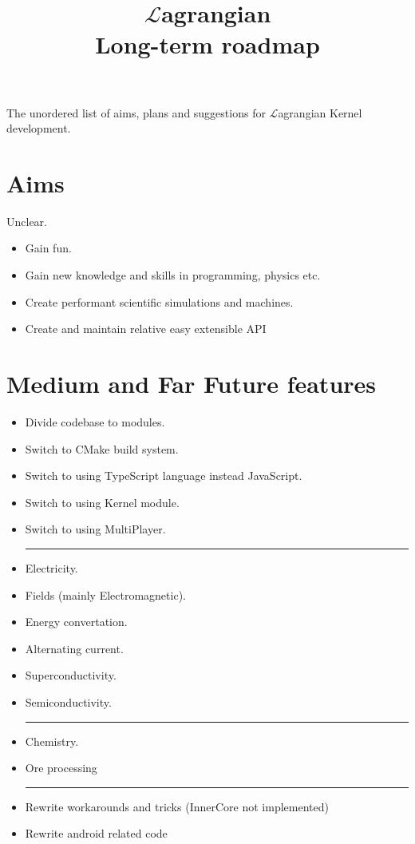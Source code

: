 \documentclass[12pt]{article}
\title{$\mathcal{L}$agrangian \\ Long-term roadmap}
\begin{document}
	\maketitle

	The unordered list of aims, plans and suggestions for $\mathcal{L}$agrangian Kernel development.

	\section{Aims}
	Unclear.
	\begin{itemize}
		\item Gain fun.
		\item Gain new knowledge and skills in programming, physics etc.
		\item Create performant scientific simulations and machines.
		\item Create and maintain relative easy extensible API
	\end{itemize}

	\section{Medium and Far Future features}

	\begin{itemize}
		\item Divide codebase to modules.
		\item Switch to CMake build system.
		\item Switch to using TypeScript language instead JavaScript.
		\item Switch to using Kernel module.
		\item Switch to using MultiPlayer. \\
		\noindent\rule{\textwidth}{0.4pt}
		\item Electricity.
		\item Fields (mainly Electromagnetic).
		\item Energy convertation.
		\item Alternating current.
		\item Superconductivity.
		\item Semiconductivity. \\
		\noindent\rule{\textwidth}{0.4pt}
		\item Chemistry.
		\item Ore processing \\
		\noindent\rule{\textwidth}{0.4pt}
		\item Rewrite workarounds and tricks (InnerCore not implemented)
		\item Rewrite android related code
	\end{itemize}
\end{document}

